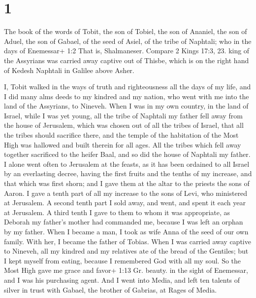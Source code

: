 \hypertarget{section}{%
\section{1}\label{section}}

 The book of the words of Tobit, the son of Tobiel, the son
of Ananiel, the son of Aduel, the son of Gabael, of the seed of Asiel,
of the tribe of Naphtali;  who in the days of Enemessar+ 1:2
That is, Shalmaneser. Compare 2 Kings 17:3, 23. king of the Assyrians
was carried away captive out of Thisbe, which is on the right hand of
Kedesh Naphtali in Galilee above Asher.

 I, Tobit walked in the ways of truth and righteousness all
the days of my life, and I did many alms deeds to my kindred and my
nation, who went with me into the land of the Assyrians, to Nineveh.
 When I was in my own country, in the land of Israel, while
I was yet young, all the tribe of Naphtali my father fell away from the
house of Jerusalem, which was chosen out of all the tribes of Israel,
that all the tribes should sacrifice there, and the temple of the
habitation of the Most High was hallowed and built therein for all ages.
 All the tribes which fell away together sacrificed to the
heifer Baal, and so did the house of Naphtali my father.  I
alone went often to Jerusalem at the feasts, as it has been ordained to
all Israel by an everlasting decree, having the first fruits and the
tenths of my increase, and that which was first shorn; and I gave them
at the altar to the priests the sons of Aaron.  I gave a
tenth part of all my increase to the sons of Levi, who ministered at
Jerusalem. A second tenth part I sold away, and went, and spent it each
year at Jerusalem.  A third tenth I gave to them to whom it
was appropriate, as Deborah my father's mother had commanded me, because
I was left an orphan by my father.  When I became a man, I
took as wife Anna of the seed of our own family. With her, I became the
father of Tobias.  When I was carried away captive to
Nineveh, all my kindred and my relatives ate of the bread of the
Gentiles;  but I kept myself from eating, 
because I remembered God with all my soul.  So the Most
High gave me grace and favor+ 1:13 Gr. beauty. in the sight of
Enemessar, and I was his purchasing agent.  And I went into
Media, and left ten talents of silver in trust with Gabael, the brother
of Gabrias, at Rages of Media.

